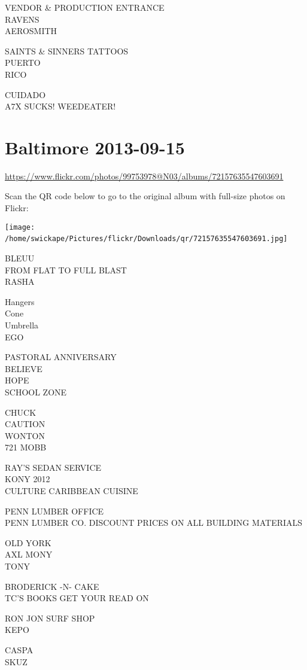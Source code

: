 \documentclass[10pt,letterpaper]{article}
\begin{document}
VENDOR \& PRODUCTION ENTRANCE\\
RAVENS\\
AEROSMITH

SAINTS \& SINNERS TATTOOS\\
PUERTO\\
RICO

CUIDADO\\
A7X SUCKS!  WEEDEATER!
\

\section*{Baltimore 2013-09-15}

\url{https://www.flickr.com/photos/99753978@N03/albums/72157635547603691}

Scan the QR code below to go to the original album with full-size photos on Flickr:

\texttt{[image: /home/swickape/Pictures/flickr/Downloads/qr/72157635547603691.jpg]}
\

BLEUU\\
FROM FLAT TO FULL BLAST\\
RASHA

Hangers\\
Cone\\
Umbrella\\
EGO

PASTORAL ANNIVERSARY\\
BELIEVE\\
HOPE\\
SCHOOL ZONE

CHUCK\\
CAUTION\\
WONTON\\
721 MOBB

RAY'S SEDAN SERVICE\\
KONY 2012\\
CULTURE CARIBBEAN CUISINE

PENN LUMBER OFFICE\\
PENN LUMBER CO. DISCOUNT PRICES ON ALL BUILDING MATERIALS

OLD YORK\\
AXL MONY\\
TONY

BRODERICK {-}N{-} CAKE\\
TC'S BOOKS GET YOUR READ ON

RON JON SURF SHOP\\
KEPO

CASPA\\
SKUZ
\end{document}
